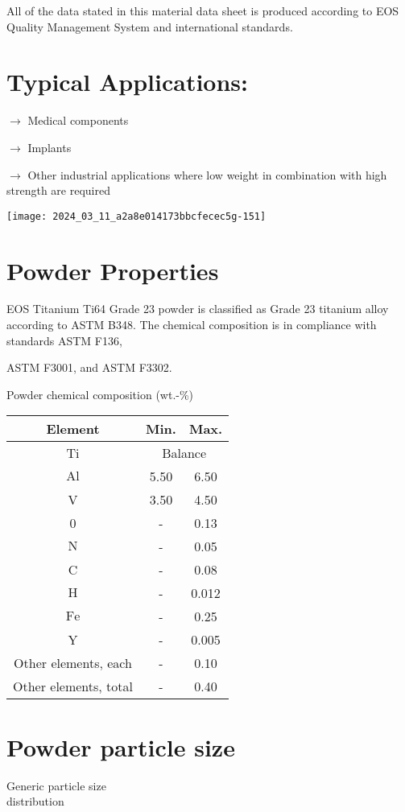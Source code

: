 \documentclass[10pt]{article}
\begin{document}
All of the data stated in this material data sheet is produced according to EOS Quality Management System and international standards.

\section*{Typical Applications:}
$\longrightarrow$ Medical components

$\longrightarrow$ Implants

$\longrightarrow$ Other industrial applications where low weight in combination with high strength are required

\begin{center}
\texttt{[image: 2024\_03\_11\_a2a8e014173bbcfecec5g-151]}
\end{center}

\section*{Powder Properties}
EOS Titanium Ti64 Grade 23 powder is classified as Grade 23 titanium alloy according to ASTM B348. The chemical composition is in compliance with standards ASTM F136,

ASTM F3001, and ASTM F3302.

Powder chemical composition (wt.-\%)

\begin{center}
\begin{tabular}{|c|c|c|}
\hline
Element & Min. & Max. \\
\hline
Ti & \multicolumn{2}{|c|}{Balance} \\
\hline
$\mathrm{Al}$ & 5.50 & 6.50 \\
\hline
V & 3.50 & 4.50 \\
\hline
0 & - & 0.13 \\
\hline
$\mathrm{N}$ & - & 0.05 \\
\hline
C & - & 0.08 \\
\hline
$\mathrm{H}$ & - & 0.012 \\
\hline
$\mathrm{Fe}$ & - & 0.25 \\
\hline
Y & - & 0.005 \\
\hline
Other elements, each & - & 0.10 \\
\hline
Other elements, total & - & 0.40 \\
\hline
\end{tabular}
\end{center}

\section*{Powder particle size}
Generic particle size\\
distribution
\end{document}
